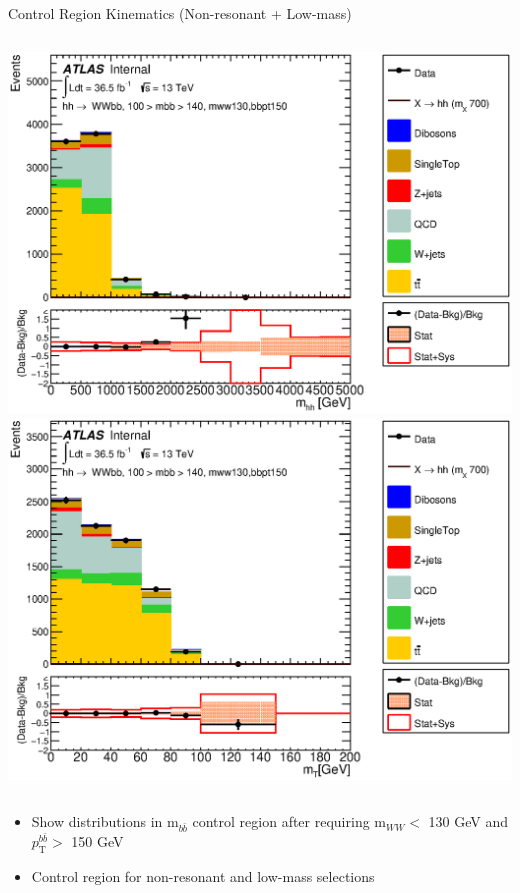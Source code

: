 \documentclass{beamer}
\newcommand*{\mww}{\ensuremath{\text{m}_{WW}}\xspace}
\newcommand*{\ptbb}{\ensuremath{p_{\text{T}}^{b\bar{b}}}\xspace}
\newcommand*{\mbb}{\ensuremath{\text{m}_{b\bar{b}}}\xspace}
\begin{document}
{\begin{frame}{Control Region Kinematics (Non-resonant + Low-mass)}
\begin{columns}
      \includegraphics*[width=1.9\textwidth] {../chapters/dihiggs2/figures/ControlPlots/36ifb_CPUpdated_opt700_mBBcr_plots_094/C_mBBcr_opt700ichep_mww_bbpt150_hhMass_regionA_met25d020}\\
      \includegraphics*[width=1.9\textwidth] {../chapters/dihiggs2/figures/ControlPlots/36ifb_CPUpdated_opt700_mBBcr_plots_094/C_mBBcr_opt700ichep_mww_bbpt150_wlepmtben_regionA_met25d020}
    \end{columns}
  \begin{itemize}\small
  \item Show distributions in \mbb control region after requiring \mww $<$ 130 GeV and \ptbb $>$ 150 GeV
  \item Control region for non-resonant and low-mass selections
  \end{itemize}
  \end{frame}

}
\end{document}
